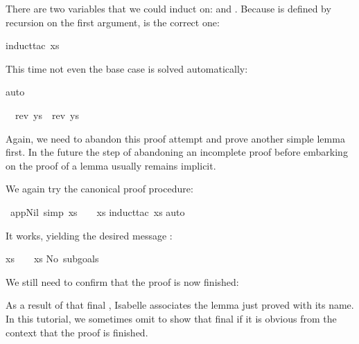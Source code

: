 \begin{isabellebody}
\begin{isamarkuptxt}
There are two variables that we could induct on:  and
. Because \isa{{\isacharat}} is defined by recursion on
the first argument,  is the correct one:%
\end{isamarkuptxt}%
\isamarkuptrue%
induct{\isacharunderscore}tac\ xs{\isacharparenright}\isamarkupfalse%
%
\begin{isamarkuptxt}%
\noindent
This time not even the base case is solved automatically:%
\end{isamarkuptxt}%
\isamarkuptrue%
auto{\isacharparenright}\isamarkupfalse%
%
\begin{isamarkuptxt}%
\begin{isabelle}%
\ {}{\isachardot}\ rev\ ys\ {\isacharequal}\ rev\ ys\ {\isacharat}\ {\isacharbrackleft}{\isacharbrackright}%
\end{isabelle}
Again, we need to abandon this proof attempt and prove another simple lemma
first. In the future the step of abandoning an incomplete proof before
embarking on the proof of a lemma usually remains implicit.%
\end{isamarkuptxt}%
\isamarkuptrue%
\isamarkupfalse%
%
\isamarkuptrue%
%
\begin{isamarkuptext}%
We again try the canonical proof procedure:%
\end{isamarkuptext}%
\isamarkuptrue%
\ app{\isacharunderscore}Nil{}\ {\isacharbrackleft}simp{\isacharbrackright}{\isacharcolon}\ {\isachardoublequote}xs\ {\isacharat}\ {\isacharbrackleft}{\isacharbrackright}\ {\isacharequal}\ xs{\isachardoublequote}\isanewline
\isamarkupfalse%
induct{\isacharunderscore}tac\ xs{\isacharparenright}\isanewline
\isamarkupfalse%
auto{\isacharparenright}\isamarkupfalse%
%
\begin{isamarkuptxt}%
\noindent
It works, yielding the desired message :
\begin{isabelle}%
xs\ {\isacharat}\ {\isacharbrackleft}{\isacharbrackright}\ {\isacharequal}\ xs\isanewline
No\ subgoals{\isacharbang}%
\end{isabelle}
We still need to confirm that the proof is now finished:%
\end{isamarkuptxt}%
\isamarkuptrue%
\isamarkupfalse%
%
\begin{isamarkuptext}%
\noindent
As a result of that final , Isabelle associates the lemma just proved
with its name. In this tutorial, we sometimes omit to show that final 
if it is obvious from the context that the proof is finished.


\end{isamarkuptext}
\end{isabellebody}
